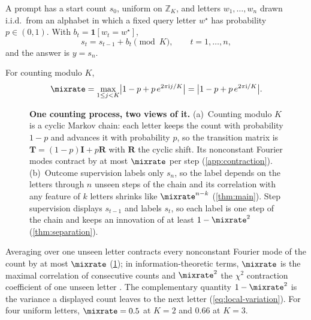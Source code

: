 \begin{definition}
\label{def:task}
A prompt has a start count $s_0$, uniform on $\mathbb Z_K$, and letters $w_1,\ldots,w_n$ drawn i.i.d.\ from an alphabet
in which a fixed query letter $w^\star$ has probability $p\in(0,1)$. With $b_t=\mathbf 1[w_t=w^\star]$,
\begin{equation}
 s_t=s_{t-1}+b_t\pmod K,\qquad t=1,\ldots,n,
 \label{eq:tracking}
\end{equation}
and the answer is $y=s_n$.
\end{definition}

\begin{definition}
\label{def:lambda}
For counting modulo $K$,
\begin{equation}
 \mixrate=\max_{1\le j<K}\bigl|1-p+p\,e^{2\pi\mathrm ij/K}\bigr|=\bigl|1-p+p\,e^{2\pi\mathrm i/K}\bigr|.
 \label{eq:lambda}
\end{equation}
\end{definition}

\begin{figure}[t]
\centering
\resizebox{\linewidth}{!}{}
\caption{\textbf{One counting process, two views of it.}
(a)~Counting modulo $K$ is a cyclic Markov chain: each letter keeps the count with probability $1-p$ and advances it with probability
$p$, so the transition matrix is $\mathbf T=(1-p)\mathbf I+p\mathbf R$ with $\mathbf R$ the cyclic shift. Its nonconstant Fourier modes
contract by at most $\mixrate$ per step (\cref{app:contraction}).
(b)~Outcome supervision labels only $s_n$, so the label depends on the letters through $n$ unseen steps of the chain and its
correlation with any feature of $k$ letters shrinks like $\mixrate^{n-k}$ (\cref{thm:main}). Step supervision displays $s_{t-1}$ and labels $s_t$, so each label is one
step of the chain and keeps an innovation of at least $1-\mixrate^2$ (\cref{thm:separation}).}
\label{fig:chain}
\end{figure}

Averaging over one unseen letter contracts every nonconstant Fourier mode of the count by at most $\mixrate$ (\cref{fig:chain}); in information-theoretic terms,
$\mixrate$ is the maximal correlation of consecutive counts and $\mixrate^2$ the $\chi^2$ contraction coefficient of one
unseen letter \citep{witsenhausen1975sequences,raginsky2016strong}. The complementary quantity $1-\mixrate^2$ is the
variance a displayed count leaves to the next letter (\cref{eq:local-variation}). For four uniform letters,
$\mixrate=0.5$ at $K=2$ and $0.66$ at $K=3$.

